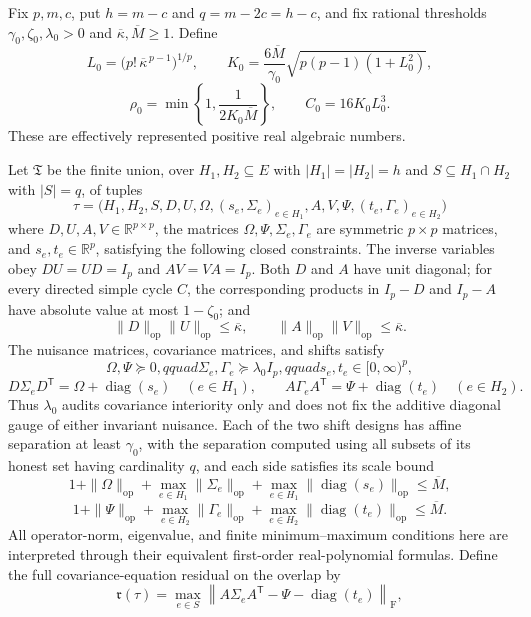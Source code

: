 Fix \(p,m,c\), put \(h=m-c\) and \(q=m-2c=h-c\), and fix rational thresholds \(\gamma _0,\zeta _0,\lambda _0>0\) and \(\overline\kappa,\overline M\geq1\).  Define
\[
 L_0=\bigl(p!\,\overline\kappa^{\,p-1}\bigr)^{1/p},\qquad
 K_0=\frac{6\overline M}{\gamma _0}
 \sqrt{p(p-1)(1+L_0^2)},
\]
\[
 \rho _0=\min\left\{1,\frac{1}{2K_0\overline M}\right\},
 \qquad C_0=16K_0L_0^3.
\]
These are effectively represented positive real algebraic numbers.

Let \(\mathfrak T\) be the finite union, over \(H_1,H_2\subseteq E\) with \(|H_1|=|H_2|=h\) and \(S\subseteq H_1\cap H_2\) with \(|S|=q\), of tuples
\[
 \tau=\bigl(H_1,H_2,S,D,U,\Omega,(s_e,\Sigma_e)_{e\in H_1},
 A,V,\Psi,(t_e,\Gamma_e)_{e\in H_2}\bigr)
\]
where \(D,U,A,V\in\mathbb R^{p\times p}\), the matrices \(\Omega,\Psi,\Sigma_e,\Gamma_e\) are symmetric \(p\times p\) matrices, and \(s_e,t_e\in\mathbb R^p\), satisfying the following closed constraints.  The inverse variables obey \(DU=UD=I_p\) and \(AV=VA=I_p\).  Both \(D\) and \(A\) have unit diagonal; for every directed simple cycle \(C\), the corresponding products in \(I_p-D\) and \(I_p-A\) have absolute value at most \(1-\zeta _0\); and
\[
 \|D\|_{\mathrm{op}}\|U\|_{\mathrm{op}}\leq\overline\kappa,
 \qquad
 \|A\|_{\mathrm{op}}\|V\|_{\mathrm{op}}\leq\overline\kappa.
\]
The nuisance matrices, covariance matrices, and shifts satisfy
\[
 \Omega,\Psi\succeq0,qquad
 \Sigma_e,\Gamma_e\succeq\lambda _0I_p,qquad
 s_e,t_e\in[0,\infty)^p,
\]
\[
 D\Sigma_eD^{\mathsf T}=\Omega+\operatorname{diag}(s_e)\quad(e\in H_1),
 \qquad
 A\Gamma_eA^{\mathsf T}=\Psi+\operatorname{diag}(t_e)\quad(e\in H_2).
\]
Thus \(\lambda_0\) audits covariance interiority only and does not fix the additive diagonal gauge of either invariant nuisance. Each of the two shift designs has affine separation at least \(\gamma _0\), with the separation computed using all subsets of its honest set having cardinality \(q\), and each side satisfies its scale bound
\[
 1+\|\Omega\|_{\mathrm{op}}+
 \max_{e\in H_1}\|\Sigma_e\|_{\mathrm{op}}+
 \max_{e\in H_1}\|\operatorname{diag}(s_e)\|_{\mathrm{op}}\leq\overline M,
\]
\[
 1+\|\Psi\|_{\mathrm{op}}+
 \max_{e\in H_2}\|\Gamma_e\|_{\mathrm{op}}+
 \max_{e\in H_2}\|\operatorname{diag}(t_e)\|_{\mathrm{op}}\leq\overline M.
\]
All operator-norm, eigenvalue, and finite minimum--maximum conditions here are interpreted through their equivalent first-order real-polynomial formulas.  Define the full covariance-equation residual on the overlap by
\[
 \mathfrak r(\tau)=
 \max_{e\in S}
 \left\|A\Sigma_eA^{\mathsf T}-\Psi-\operatorname{diag}(t_e)\right\|_{\mathrm F},
\]
